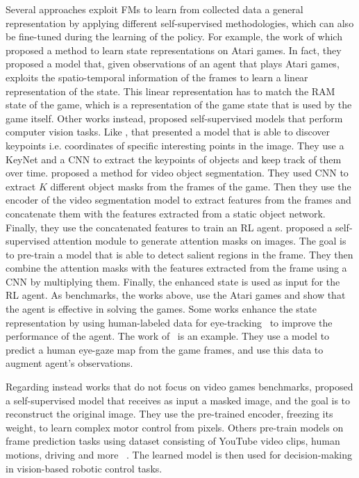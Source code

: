 Several approaches exploit FMs to learn from collected data a general representation by applying different self-supervised methodologies, which can also be fine-tuned during the learning of the policy.
For example, the work of \citet{anand2019unsupervised} which proposed a method to learn state representations on Atari games.
In fact, they proposed a model that, given observations of an agent that plays Atari games, exploits the spatio-temporal information of the frames to learn a linear representation of the state.
This linear representation has to match the RAM state of the game, which is a representation of the game state that is used by the game itself.
Other works instead, proposed self-supervised models that perform computer vision tasks.
Like \citet{kulkarni2019unsupervised}, that presented a model that is able to discover keypoints i.e. coordinates of specific interesting points in the image.
They use a KeyNet \citep{jakab2018keynet} and a CNN to extract the keypoints of objects and keep track of them over time.
\citet{goel2018unsupervised} proposed a method for video object segmentation.
They used CNN to extract $K$ different object masks from the frames of the game.
Then they use the encoder of the video segmentation model to extract features from the frames and concatenate them with
the features extracted from a static object network.
Finally, they use the concatenated features to train an RL agent.
\citet{wu2021self} proposed a self-supervised attention module to generate attention masks on images.
The goal is to pre-train a model that is able to detect salient regions in the frame.
They then combine the attention masks with the features extracted from the frame using a CNN by multiplying them.
Finally, the enhanced state is used as input for the RL agent.
As benchmarks, the works above, use the Atari games and show that the agent is effective in solving the games.
Some works enhance the state representation by using human-labeled data for eye-tracking~\citep{zhang2020atari} to improve the performance of the agent.
The work of~\citet{thammineni2023selective} is an example.
They use a model to predict a human eye-gaze map from the game frames, and use this data to augment agent's observations.

Regarding instead works that do not focus on video games benchmarks, \citet{xiao2022masked} proposed a self-supervised model that receives as input a masked image, and the goal is to reconstruct the original image.
They use the pre-trained encoder, freezing its weight, to learn complex motor control from pixels.
Others pre-train models on frame prediction tasks using dataset consisting of YouTube video clips, human motions, driving and more ~\citep{finn2016unsupervised}.
The learned model is then used for decision-making in vision-based robotic control tasks.




